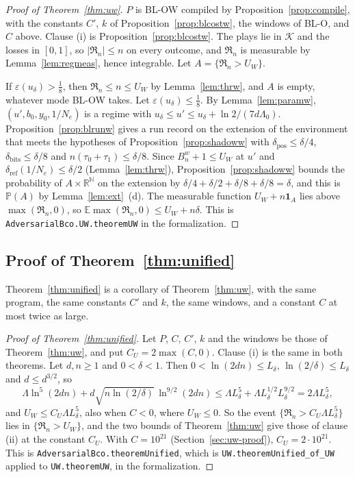 \documentclass[11pt]{amsart}
\theoremstyle{definition}
\numberwithin{equation}{section}
\newcommand{\R}{\mathbb{R}}
\newcommand{\E}{\mathbb{E}}
\newcommand{\Prob}{\mathbb{P}}
\newcommand{\cK}{\mathcal{K}}
\newcommand{\Reg}{\mathfrak{R}}
\begin{document}
\begin{proof}[Proof of Theorem~\ref{thm:uw}]
$P$ is BL-OW compiled by Proposition~\ref{prop:compile}, with the constants $C'$, $k$ of Proposition~\ref{prop:blcostw}, the windows of BL-O, and $C$ above. Clause (i) is Proposition~\ref{prop:blcostw}. The plays lie in $\cK$ and the losses in $[0,1]$, so $|\Reg_n|\le n$ on every outcome, and $\Reg_n$ is measurable by Lemma~\ref{lem:regmeas}, hence integrable. Let $A=\{\Reg_n>U_W\}$.

If $\varepsilon(u_\delta)>\frac18$, then $\Reg_n\le n\le U_W$ by Lemma~\ref{lem:thrw}, and $A$ is empty, whatever mode BL-OW takes. Let $\varepsilon(u_\delta)\le\frac18$. By Lemma~\ref{lem:paramw}, $(u',b_0,y_0,1/N_e)$ is a regime with $u_\delta\le u'\le u_\delta+\ln2/(7d\Lambda_0)$. Proposition~\ref{prop:blrunw} gives a run record on the extension of the environment that meets the hypotheses of Proposition~\ref{prop:shadoww} with $\delta_{\mathrm{pos}}\le\delta/4$, $\delta_{\mathrm{bits}}\le\delta/8$ and $n(\tau_0+\tau_1)\le\delta/8$. Since $B^w_n+1\le U_W$ at $u'$ and $\delta_{\mathrm{ref}}(1/N_e)\le\delta/2$ (Lemma~\ref{lem:thrw}), Proposition~\ref{prop:shadoww} bounds the probability of $A\times\R^{\mathbb N}$ on the extension by $\delta/4+\delta/2+\delta/8+\delta/8=\delta$, and this is $\Prob(A)$ by Lemma~\ref{lem:ext}~(d). The measurable function $U_W+n\mathbf 1_A$ lies above $\max(\Reg_n,0)$, so $\E\max(\Reg_n,0)\le U_W+n\delta$. This is \texttt{AdversarialBco.\allowbreak UW.\allowbreak theoremUW} in the formalization.
\end{proof}

\subsection{Proof of Theorem~\ref{thm:unified}}\label{sec:bit-proof}

Theorem~\ref{thm:unified} is a corollary of Theorem~\ref{thm:uw}, with the same program, the same constants $C'$ and $k$, the same windows, and a constant $C$ at most twice as large.

\begin{proof}[Proof of Theorem~\ref{thm:unified}]
Let $P$, $C$, $C'$, $k$ and the windows be those of Theorem~\ref{thm:uw}, and put $C_U=2\max(C,0)$. Clause (i) is the same in both theorems. Let $d,n\ge1$ and $0<\delta<1$. Then $0<\ln(2dn)\le L_\delta$, $\ln(2/\delta)\le L_\delta$ and $d\le d^{3/2}$, so
\[
\Lambda\ln^5(2dn)+d\sqrt{n\ln(2/\delta)}\,\ln^{9/2}(2dn)\le\Lambda L_\delta^5+\Lambda L_\delta^{1/2}L_\delta^{9/2}=2\Lambda L_\delta^5 ,
\]
and $U_W\le C_U\Lambda L_\delta^5$, also when $C<0$, where $U_W\le0$. So the event $\{\Reg_n>C_U\Lambda L_\delta^5\}$ lies in $\{\Reg_n>U_W\}$, and the two bounds of Theorem~\ref{thm:uw} give those of clause (ii) at the constant $C_U$. With $C=10^{21}$ (Section~\ref{sec:uw-proof}), $C_U=2\cdot10^{21}$. This is \texttt{AdversarialBco.\allowbreak theoremUnified}, which is \texttt{UW.\allowbreak theoremUnified\_of\_UW} applied to \texttt{UW.\allowbreak theoremUW}, in the formalization.
\end{proof}
\end{document}
